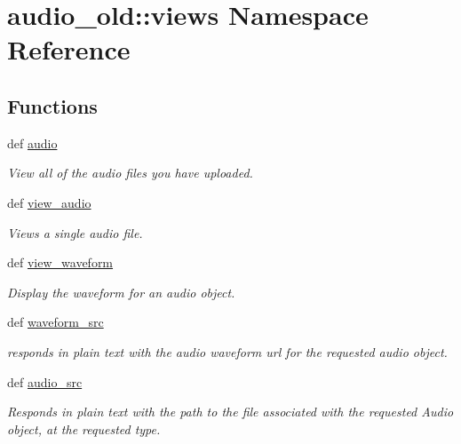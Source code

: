 \hypertarget{namespaceaudio__old_1_1views}{
\section{audio\_\-old::views Namespace Reference}
\label{namespaceaudio__old_1_1views}
}
\subsection*{Functions}
\begin{DoxyCompactItemize}
\item 
def \hyperlink{namespaceaudio__old_1_1views_a91173882b15c026a6a9d9e95501f4ec0}{audio}
\begin{DoxyCompactList}\small\item\em View all of the audio files you have uploaded. \item\end{DoxyCompactList}\item 
def \hyperlink{namespaceaudio__old_1_1views_ac6bd2750e947a90a5e0989aaa226d515}{view\_\-audio}
\begin{DoxyCompactList}\small\item\em Views a single audio file. \item\end{DoxyCompactList}\item 
def \hyperlink{namespaceaudio__old_1_1views_aa285ef2efcd9e10ca54b55f85945f839}{view\_\-waveform}
\begin{DoxyCompactList}\small\item\em Display the waveform for an audio object. \item\end{DoxyCompactList}\item 
def \hyperlink{namespaceaudio__old_1_1views_a2bbe10a81a6319ee9ac6575dd71c8a97}{waveform\_\-src}
\begin{DoxyCompactList}\small\item\em responds in plain text with the audio waveform url for the requested audio object. \item\end{DoxyCompactList}\item 
def \hyperlink{namespaceaudio__old_1_1views_ac0d8e36d9a56e447108731930de4c8a0}{audio\_\-src}
\begin{DoxyCompactList}\small\item\em Responds in plain text with the path to the file associated with the requested Audio object, at the requested type. \item\end{DoxyCompactList}\item 

\end{DoxyCompactItemize}
